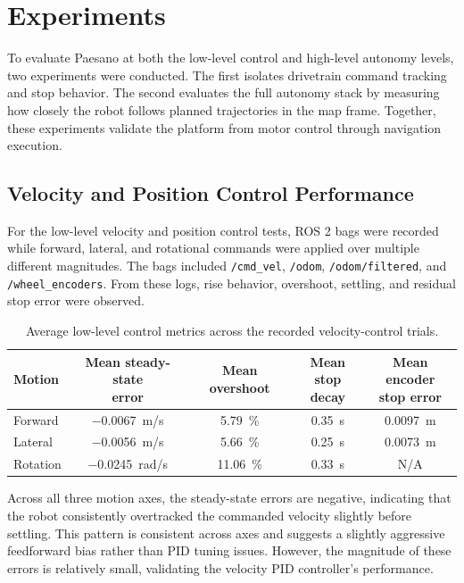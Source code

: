 \documentclass[11pt]{article}
\begin{document}
\section{Experiments}
To evaluate Paesano at both the low-level control and high-level autonomy levels, two experiments were conducted. The
first isolates drivetrain command tracking and stop behavior. The second evaluates the full autonomy stack by measuring
how closely the robot follows planned trajectories in the map frame. Together, these experiments validate the platform
from motor control through navigation execution.
\subsection{Velocity and Position Control Performance}
For the low-level velocity and position control tests, ROS 2 bags were recorded
while forward, lateral, and rotational commands were applied over multiple
different magnitudes. The bags included \texttt{/cmd\_vel}, \texttt{/odom},
\texttt{/odom/filtered}, and \texttt{/wheel\_encoders}. From these logs, rise
behavior, overshoot, settling, and residual stop error were observed. 

\begin{table}[H]
    \centering
    \caption{Average low-level control metrics across the recorded velocity-control trials.}
    \label{tab:velocity-control-summary}
    \small
    \begin{tabular}{lcccc}
        \toprule
        Motion & \shortstack{Mean steady-state\\error} & Mean overshoot & \shortstack{Mean stop\\decay} &
        \shortstack{Mean encoder\\stop error} \\
        \midrule
        Forward & \SI{-0.0067}{m/s} & \SI{5.79}{\percent} & \SI{0.35}{s} & \SI{0.0097}{m} \\
        Lateral & \SI{-0.0056}{m/s} & \SI{5.66}{\percent} & \SI{0.25}{s} & \SI{0.0073}{m} \\
        Rotation & \SI{-0.0245}{rad/s} & \SI{11.06}{\percent} & \SI{0.33}{s} & N/A \\
        \bottomrule
    \end{tabular}
\end{table}

\noindent 
Across all three motion axes, the steady-state errors are negative, indicating that the robot consistently 
overtracked the commanded velocity slightly before settling. This pattern is consistent across axes and 
suggests a slightly aggressive feedforward bias rather than PID tuning issues. However, the 
magnitude of these errors is relatively small, validating the velocity PID controller's performance.
\end{document}
